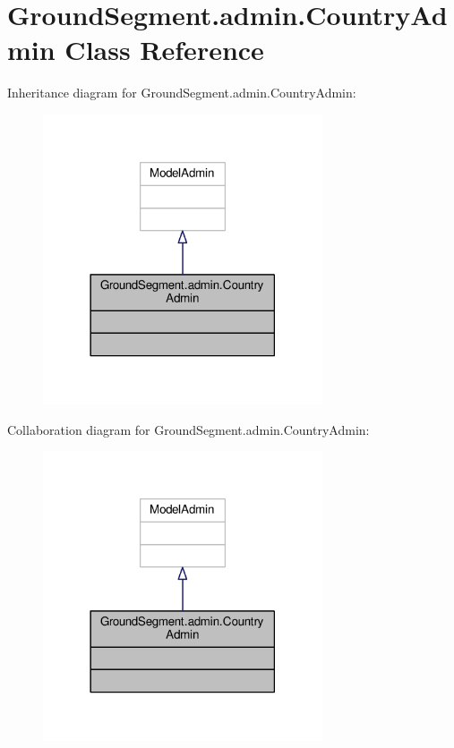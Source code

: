 \hypertarget{class_ground_segment_1_1admin_1_1_country_admin}{}\section{Ground\+Segment.\+admin.\+Country\+Admin Class Reference}
\label{class_ground_segment_1_1admin_1_1_country_admin}


Inheritance diagram for Ground\+Segment.\+admin.\+Country\+Admin\+:\nopagebreak
\begin{figure}[H]
\begin{center}
\leavevmode
\includegraphics[width=234pt]{class_ground_segment_1_1admin_1_1_country_admin__inherit__graph}
\end{center}
\end{figure}


Collaboration diagram for Ground\+Segment.\+admin.\+Country\+Admin\+:\nopagebreak
\begin{figure}[H]
\begin{center}
\leavevmode
\includegraphics[width=234pt]{class_ground_segment_1_1admin_1_1_country_admin__coll__graph}
\end{center}
\end{figure}


